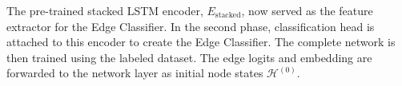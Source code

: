 The pre-trained stacked LSTM encoder, \(E_\text{stacked}\), now served as the feature extractor for the Edge Classifier. In the second phase, classification head is attached to this encoder to create the Edge Classifier. The complete network is then trained using the labeled dataset. The edge logits and embedding are forwarded to the network layer as initial node states \(\mathcal{H}^{(0)}\).
